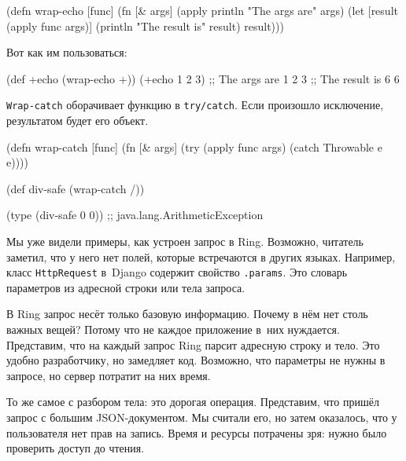 \begin{english}
  \begin{clojure}
(defn wrap-echo [func]
  (fn [& args]
    (apply println "The args are" args)
    (let [result (apply func args)]
      (println "The result is" result)
      result)))
  \end{clojure}
\end{english}

Вот как им пользоваться:

\begin{english}
  \begin{clojure}
(def +echo (wrap-echo +))
(+echo 1 2 3)
;; The args are 1 2 3
;; The result is 6
6
  \end{clojure}
\end{english}


\mnoindent
\verb|Wrap-catch| оборачивает функцию в \verb|try/catch|. Если произошло
исключение, результатом будет его объект.

\begin{english}
  \begin{clojure}
(defn wrap-catch [func]
  (fn [& args]
    (try
      (apply func args)
      (catch Throwable e
        e))))

(def div-safe (wrap-catch /))

(type (div-safe 0 0))
;; java.lang.ArithmeticException
  \end{clojure}
\end{english}


Мы уже видели примеры, как устроен запрос в Ring. Возможно, читатель заметил,
что у него нет полей, которые встречаются в других языках. Например, класс
\verb|HttpRequest| в~Django содержит свойство \verb|.params|. Это словарь
параметров из адресной строки или тела запроса.

В Ring запрос несёт только базовую информацию. Почему в нём нет столь важных
вещей? Потому что не каждое приложение в~них нуждается. Представим, что на
каждый запрос Ring парсит адресную строку и тело. Это удобно разработчику, но
замедляет код. Возможно, что параметры не нужны в запросе, но сервер потратит на
них время.

То же самое с разбором тела: это дорогая операция. Представим, что пришёл запрос
с большим JSON-документом. Мы считали его, но затем оказалось, что у
пользователя нет прав на запись. Время и ресурсы потрачены зря: нужно было
проверить доступ до чтения.


